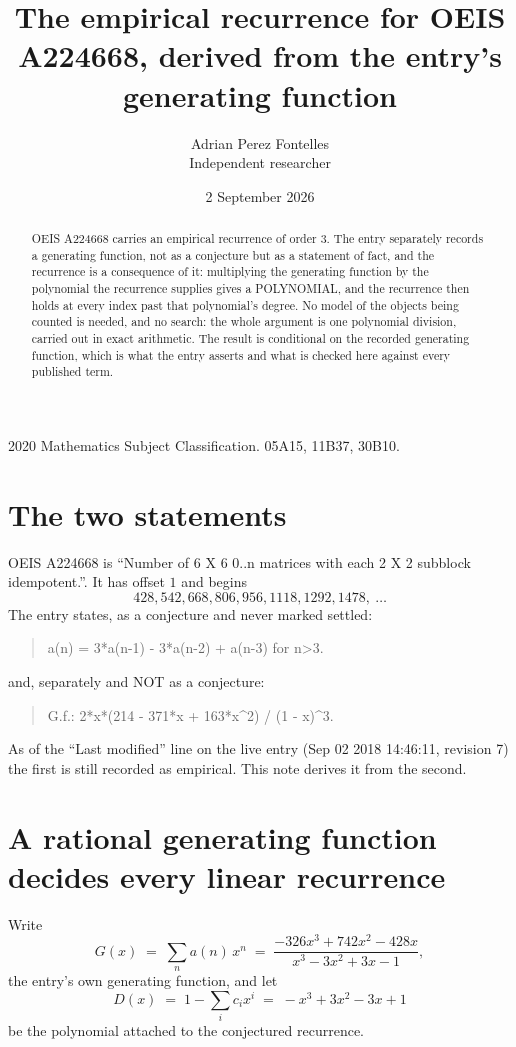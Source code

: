\documentclass[11pt,a4paper]{article}
\title{The empirical recurrence for OEIS A224668, derived from the entry's generating function}
\author{Adrian Perez Fontelles\\ \small Independent researcher}
\date{2 September 2026}
\theoremstyle{plain}
\theoremstyle{definition}
\begin{document}
\maketitle

\begin{abstract}
OEIS A224668 carries an empirical recurrence of order $3$. The entry separately records a
generating function, not as a conjecture but as a statement of fact, and the recurrence is a
consequence of it: multiplying the generating function by the polynomial the recurrence
supplies gives a POLYNOMIAL, and the recurrence then holds at every index past that
polynomial's degree. No model of the objects being counted is needed, and no search: the
whole argument is one polynomial division, carried out in exact arithmetic. The result is
conditional on the recorded generating function, which is what the entry asserts and what is
checked here against every published term.
\end{abstract}

\noindent\small 2020 Mathematics Subject Classification. 05A15, 11B37, 30B10.\normalsize

\section{The two statements}

OEIS A224668 is ``Number of 6 X 6 0..n matrices with each 2 X 2 subblock idempotent.''. It has offset $1$ and begins
\[
428, 542, 668, 806, 956, 1118, 1292, 1478,\ \dots
\]
The entry states, as a conjecture and never marked settled:
\begin{quote}
a(n) = 3*a(n-1) - 3*a(n-2) + a(n-3) for n>3.
\end{quote}
and, separately and NOT as a conjecture:
\begin{quote}
G.f.: 2*x*(214 - 371*x + 163*x\^{}2) / (1 - x)\^{}3.
\end{quote}
As of the ``Last modified'' line on the live entry (Sep 02 2018 14:46:11, revision 7) the first is still
recorded as empirical. This note derives it from the second.

\section{A rational generating function decides every linear recurrence}

Write
\[
G(x)\;=\;\sum_{n}a(n)\,x^{n}\;=\;\frac{- 326 x^{3} + 742 x^{2} - 428 x}{x^{3} - 3 x^{2} + 3 x - 1},
\]
the entry's own generating function, and let
\[
D(x)\;=\;1-\sum_i c_i x^{i}\;=\;- x^{3} + 3 x^{2} - 3 x + 1
\]
be the polynomial attached to the conjectured recurrence.
\end{document}
